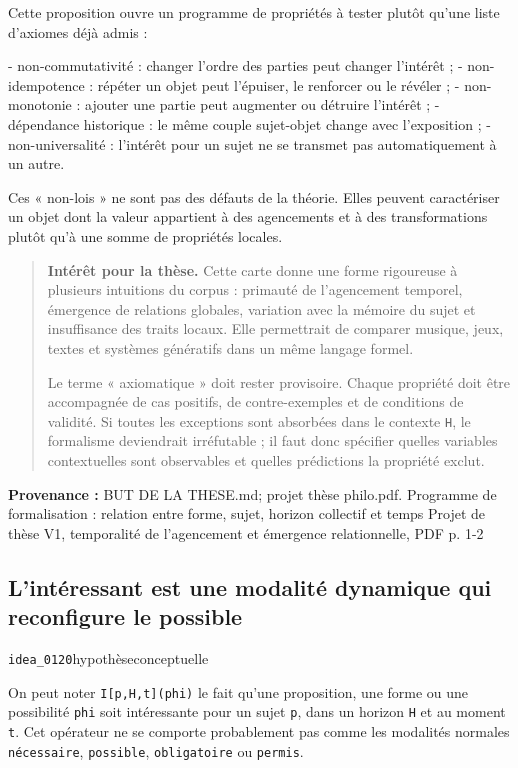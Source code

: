 \documentclass[10pt,a4paper]{article}
\begin{document}
Cette proposition ouvre un programme de propriétés à tester plutôt qu'une liste d'axiomes déjà admis :

- non-commutativité : changer l'ordre des parties peut changer l'intérêt ; - non-idempotence : répéter un objet peut l'épuiser, le renforcer ou le révéler ; - non-monotonie : ajouter une partie peut augmenter ou détruire l'intérêt ; - dépendance historique : le même couple sujet-objet change avec l'exposition ; - non-universalité : l'intérêt pour un sujet ne se transmet pas automatiquement à un autre.

Ces « non-lois » ne sont pas des défauts de la théorie. Elles peuvent caractériser un objet dont la valeur appartient à des agencements et à des transformations plutôt qu'à une somme de propriétés locales.

\begin{quote}
\textbf{Intérêt pour la thèse.} Cette carte donne une forme rigoureuse à plusieurs intuitions du corpus : primauté de l'agencement temporel, émergence de relations globales, variation avec la mémoire du sujet et insuffisance des traits locaux. Elle permettrait de comparer musique, jeux, textes et systèmes génératifs dans un même langage formel.

Le terme « axiomatique » doit rester provisoire. Chaque propriété doit être accompagnée de cas positifs, de contre-exemples et de conditions de validité. Si toutes les exceptions sont absorbées dans le contexte \texttt{H}, le formalisme deviendrait irréfutable ; il faut donc spécifier quelles variables contextuelles sont observables et quelles prédictions la propriété exclut.
\end{quote}
{\footnotesize\color{metadata}\textbf{Provenance :} BUT DE LA THESE.md; projet thèse philo.pdf. Programme de formalisation : relation entre forme, sujet, horizon collectif et temps Projet de thèse V1, temporalité de l'agencement et émergence relationnelle, PDF p. 1-2\par}

\subsection{L'intéressant est une modalité dynamique qui reconfigure le possible}
{\small\color{metadata} \texttt{idea\_0120}\quad\textbullet\quad hypothèse\quad\textbullet\quad conceptuelle\par}

On peut noter \texttt{I[p,H,t](phi)} le fait qu'une proposition, une forme ou une possibilité \texttt{phi} soit intéressante pour un sujet \texttt{p}, dans un horizon \texttt{H} et au moment \texttt{t}. Cet opérateur ne se comporte probablement pas comme les modalités normales \texttt{nécessaire}, \texttt{possible}, \texttt{obligatoire} ou \texttt{permis}.
\end{document}
